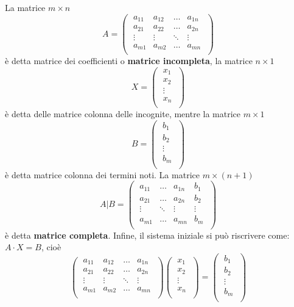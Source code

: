 La matrice \(m \times n\) \[
A =
\left( \; \begin{matrix}
    a_{11} & a_{12} & \ldots  & a_{1n} \\
    a_{21} & a_{22} & \ldots  & a_{2n} \\
    \vdots & \vdots & \ddots & \vdots \\
    a_{m1} & a_{m 2} & \ldots  & a_{mn} \\
\end{matrix} \; \right)
\] è detta matrice dei coefficienti o \textbf{matrice incompleta}, la matrice \(n \times 1\) \[
X =
\left( \; \begin{matrix}
    x_1 \\
    x_2 \\
    \vdots \\
    x_n \\
\end{matrix} \; \right)
\] è detta delle matrice colonna delle incognite, mentre la matrice \(m\times 1\) \[
B = 
\left( \; \begin{matrix}
    b_1 \\
    b_2 \\
    \vdots \\
    b_m \\
\end{matrix} \; \right)
\] è detta matrice colonna dei termini noti. La matrice \(m \times (n+1)\) \[
A | B = 
\left( \; \begin{matrix}
    a_{11} & \ldots  & a_{1n} & b_1 \\
    a_{21} & \ldots  & a_{2n} & b_2 \\
    \vdots & \ddots & \vdots & \vdots \\
    a_{m1} & \ldots  & a_{mn} & b_m \\
\end{matrix} \; \right)
\] è detta \textbf{matrice completa}.
Infine, il sistema iniziale si può riscrivere come: \(A \cdot X = B\), cioè \[
\left( \; \begin{matrix}
    a_{11} & a_{12} & \ldots  & a_{1n} \\
    a_{21} & a_{22} & \ldots  & a_{2n} \\
    \vdots & \vdots & \ddots & \vdots \\
    a_{m1} & a_{m 2} & \ldots  & a_{mn} \\
\end{matrix} \; \right)
\left( \; \begin{matrix}
    x_1 \\
    x_2 \\
    \vdots \\
    x_n \\
\end{matrix} \; \right)
=
\left( \; \begin{matrix}
    b_1 \\
    b_2 \\
    \vdots \\
    b_m \\
\end{matrix} \; \right)
\] 

